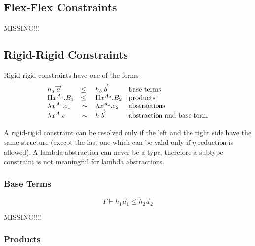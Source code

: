 \subsection{Flex-Flex Constraints}

MISSING!!!








\subsection{Rigid-Rigid Constraints}

Rigid-rigid constraints have one of the forms
$$
    \begin{array}{lllll} 
        h_a {\overrightarrow {a}} &\le& h_b {\overrightarrow {b}}
        & \text{base terms}
        \\
        \Pi x^{A_1}. B_1 &\le& \Pi x^{A_2}. B_2
        & \text{products}
        \\
        \lambda x^{A_1}. e_1 &\,\sim\,& \lambda x^{A_2}. e_2
        & \text{abstractions}
        \\
        \lambda x^A. e & \,\sim\, & h {\overrightarrow {b}}
        & \text{abstraction and base term}
     \end{array}
$$

A rigid-rigid constraint can be resolved only if the left and the right side
have the same structure (except the last one which can be valid only if
$\eta$-reduction is allowed). A lambda abstraction can never be a type,
therefore a subtype constraint is not meaningful for lambda abstractions.








\subsubsection{Base Terms}


$$
    \Gamma \vdash h_1 \vec a_1 \le h_2 \vec a_2
$$

MISSING!!!!


\subsubsection{Products}

